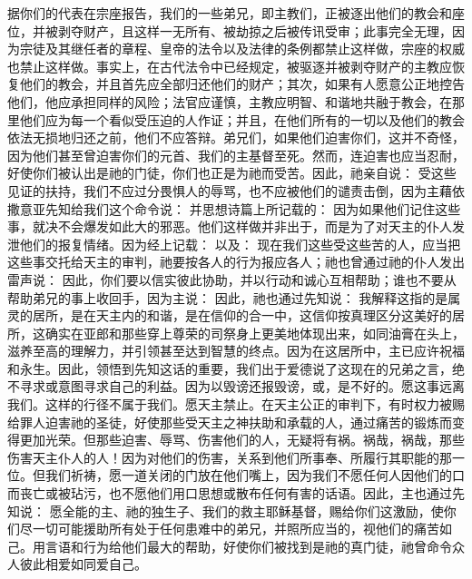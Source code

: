 据你们的代表在宗座报告，我们的一些弟兄，即主教们，正被逐出他们的教会和座位，并被剥夺财产，且这样一无所有、被劫掠之后被传讯受审；此事完全无理，因为宗徒及其继任者的章程、皇帝的法令以及法律的条例都禁止这样做，宗座的权威也禁止这样做。事实上，在古代法令中已经规定，被驱逐并被剥夺财产的主教应恢复他们的教会，并且首先应全部归还他们的财产；其次，如果有人愿意公正地控告他们，他应承担同样的风险；法官应谨慎，主教应明智、和谐地共融于教会，在那里他们应为每一个看似受压迫的人作证；并且，在他们所有的一切以及他们的教会依法无损地归还之前，他们不应答辩。弟兄们，如果他们迫害你们，这并不奇怪，因为他们甚至曾迫害你们的元首、我们的主基督至死。然而，连迫害也应当忍耐，好使你们被认出是祂的门徒，你们也正是为祂而受苦。因此，祂亲自说：  受这些见证的扶持，我们不应过分畏惧人的辱骂，也不应被他们的谴责击倒，因为主藉依撒意亚先知给我们这个命令说：  并思想诗篇上所记载的：  因为如果他们记住这些事，就决不会爆发如此大的邪恶。他们这样做并非出于，而是为了对天主的仆人发泄他们的报复情绪。因为经上记载：  以及：  现在我们这些受这些苦的人，应当把这些事交托给天主的审判，祂要按各人的行为报应各人；祂也曾通过祂的仆人发出雷声说：  因此，你们要以信实彼此协助，并以行动和诚心互相帮助；谁也不要从帮助弟兄的事上收回手，因为主说：  因此，祂也通过先知说： 我解释这指的是属灵的居所，是在天主内的和谐，是在信仰的合一中，这信仰按真理区分这美好的居所，这确实在亚郎和那些穿上尊荣的司祭身上更美地体现出来，如同油膏在头上，滋养至高的理解力，并引领甚至达到智慧的终点。因为在这居所中，主已应许祝福和永生。因此，领悟到先知这话的重要，我们出于爱德说了这现在的兄弟之言，绝不寻求或意图寻求自己的利益。因为以毁谤还报毁谤，或，是不好的。愿这事远离我们。这样的行径不属于我们。愿天主禁止。在天主公正的审判下，有时权力被赐给罪人迫害祂的圣徒，好使那些受天主之神扶助和承载的人，通过痛苦的锻炼而变得更加光荣。但那些迫害、辱骂、伤害他们的人，无疑将有祸。祸哉，祸哉，那些伤害天主仆人的人！因为对他们的伤害，关系到他们所事奉、所履行其职能的那一位。但我们祈祷，愿一道关闭的门放在他们嘴上，因为我们不愿任何人因他们的口而丧亡或被玷污，也不愿他们用口思想或散布任何有害的话语。因此，主也通过先知说： 愿全能的主、祂的独生子、我们的救主耶稣基督，赐给你们这激励，使你们尽一切可能援助所有处于任何患难中的弟兄，并照所应当的，视他们的痛苦如己。用言语和行为给他们最大的帮助，好使你们被找到是祂的真门徒，祂曾命令众人彼此相爱如同爱自己。\par

